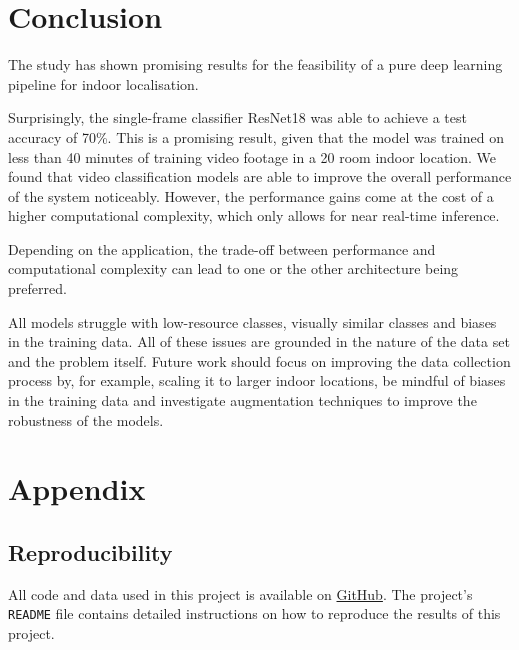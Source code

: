 \documentclass[a4paper]{article}
\begin{document}

\section{Conclusion} %
\label{sec:conclusion}

The study has shown promising results for the feasibility of a pure deep
learning pipeline for indoor localisation.

Surprisingly, the single-frame classifier ResNet18 was able to achieve a test
accuracy of 70\%. This is a promising result, given that the model was trained
on less than 40 minutes of training video footage in a 20 room indoor
location. We found that video classification models are able to improve the
overall performance of the system noticeably. However, the performance gains
come at the cost of a higher computational complexity, which only allows for
near real-time inference. 

Depending on the application, the trade-off between performance and
computational complexity can lead to one or the other architecture being
preferred.

All models struggle with low-resource classes, visually similar classes and
biases in the training data. All of these issues are grounded in the nature of
the data set and the problem itself. Future work should focus on improving the 
data collection process by, for example, scaling it to larger indoor locations,
be mindful of biases in the training data and investigate augmentation
techniques to improve the robustness of the models.



\newpage




\newpage
\section{Appendix} %
\label{sec:appendix}

\subsection{Reproducibility} %
\label{sub:reproducibility}

All code and data used in this project is available on
\href{https://github.com/mikasenghaas/bsc}{GitHub}. The project's
\texttt{README} file contains detailed instructions on how to reproduce the
results of this project.
\end{document}
